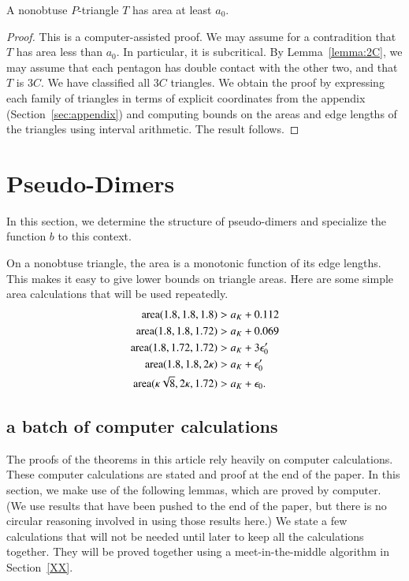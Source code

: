 \begin{lemma}\label{lemma:a0}  
A nonobtuse $P$-triangle $T$ has area at least $a_0$.
\end{lemma}

\begin{proof} This is a computer-assisted proof.  We may assume for a
  contradition that $T$ has area less than $a_0$.  In particular, it
  is subcritical.  By Lemma~\ref{lemma:2C}, we may assume that each
  pentagon has double contact with the other two, and that $T$ is
  $3C$.  We have classified all $3C$ triangles.  We obtain the proof
by expressing each family of triangles in terms of explicit
coordinates from the appendix (Section~\ref{sec:appendix}) and
computing bounds on the areas and edge lengths of the triangles using
interval arithmetic.  The result follows.
\end{proof}

\section{Pseudo-Dimers}

In this section, we determine the structure of pseudo-dimers and specialize
the function $b$ to this context.

On a nonobtuse triangle, the area is a monotonic function of its edge lengths.
This makes it easy to give lower bounds on triangle areas.
Here are some simple    area calculations that will be used repeatedly.
\begin{align*}
{\operatorname{area}}(1.8,1.8,1.8) &> a_K + 0.112\\
{\operatorname{area}}(1.8,1.8,1.72) &> a_K + 0.069\\
{\operatorname{area}}(1.8,1.72,1.72) &> a_K + 3\epsilon_0'\\
{\operatorname{area}}(1.8,1.8,2\kappa) &> a_K + \epsilon_0'\\
{\operatorname{area}}(\kappa\sqrt8,2\kappa,1.72) &> a_K +\epsilon_0.
\end{align*}

\subsection{a batch of computer calculations}\label{sec:calc}

The proofs of the theorems in this article rely heavily on computer calculations.
These computer calculations are stated and proof at the end of the paper.
In this section, we make use of the following lemmas, which are proved by
computer.  (We use results that have been pushed to the end of the paper, but
there is no circular reasoning involved in using those results here.)  We state
a few calculations that will not be needed until later to keep all  the calculations
together.  They will be proved together using a meet-in-the-middle algorithm in
Section~\ref{XX}.

